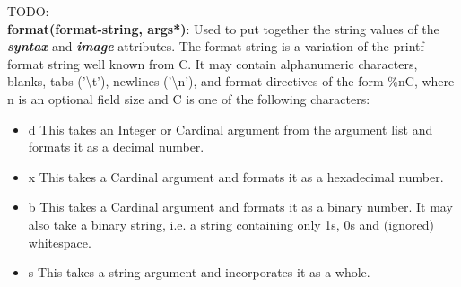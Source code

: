 TODO:\\

\textbf{format(format-string, args*)}:
Used to put together the string values of the \textbf{\textit{syntax}} and \textbf{\textit{image}}
attributes. The format string is a variation of the printf format string well known from C.
It may contain alphanumeric characters, blanks, tabs ('\textbackslash t'), newlines
('\textbackslash n'), and format directives of the form \%nC, where n is an optional field size
and C is one of the following characters:

\begin{itemize}

\item  d This takes an Integer or Cardinal argument from the argument list and formats it as a
         decimal number.

\item  x This takes a Cardinal argument and formats it as a hexadecimal number.

\item  b This takes a Cardinal argument and formats it as a binary number. It may also take a
         binary string, i.e. a string containing only 1s, 0s and (ignored) whitespace.

\item  s This takes a string argument and incorporates it as a whole.

\end{itemize}


